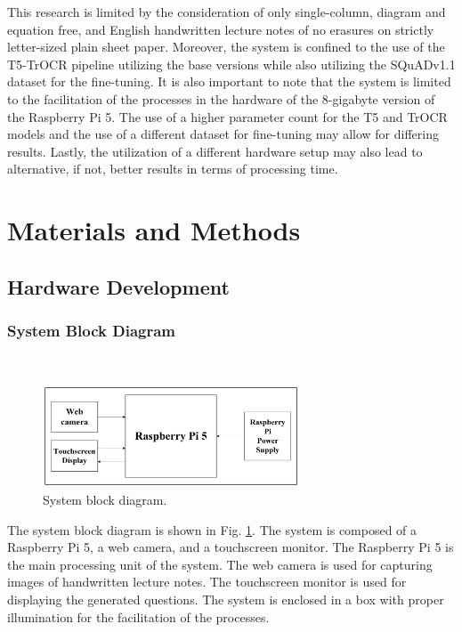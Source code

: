 \documentclass[conference]{IEEEtran}
\begin{document}
\indent This research is limited by the consideration of only 
single-column, diagram and equation free, and English handwritten lecture notes 
of no erasures on strictly letter-sized plain sheet paper.
Moreover, the system is confined to the 
use of the T5-TrOCR pipeline utilizing the base versions while 
also utilizing the SQuADv1.1 dataset for the fine-tuning. It is also important 
to note that the system is limited to the facilitation of the processes in 
the hardware of the 8-gigabyte version of the Raspberry Pi 5. The use of 
a higher parameter count for the T5 and TrOCR models and the use of a different 
dataset for fine-tuning may allow for differing results. Lastly, the 
utilization of a different hardware setup may also lead to alternative, if not, 
better results in terms of processing time. 
\section{Materials and Methods}
    \subsection{Hardware Development}
        \subsubsection{System Block Diagram}
            \hfill \\
            \vspace{-0.6cm}
            \begin{figure}[H]
                \centerline{\includegraphics[width=3.0in]{blockdiag.png}}
                \vspace{-0.3cm}
                \caption{System block diagram.} 
                \label{blockdiagram}
            \end{figure} 
            \vspace{-0.4cm}
            \newpage
            \indent The system block diagram is shown in Fig. 
            \ref{blockdiagram}. The system is composed of a 
            Raspberry Pi 5, a web camera, and a 
            touchscreen monitor. The Raspberry Pi 5 is the main 
            processing unit of the system. The web camera is 
            used for capturing images of handwritten lecture notes. 
            The touchscreen monitor is used for displaying the 
            generated questions. The system is enclosed in a box 
            with proper illumination for the facilitation of the 
            processes.
        \vspace{0.2cm}
\end{document}
